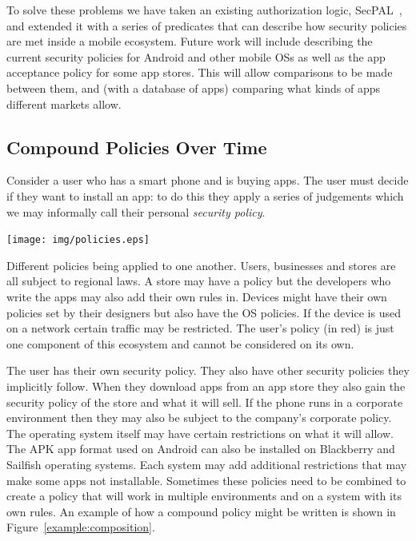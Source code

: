 \documentclass[a4paper]{article}
\begin{document}
To solve these problems we have taken an existing authorization logic,
SecPAL~\cite{Becker:2006vh}, and extended it with a series of predicates that
can describe how security policies are met inside a mobile ecosystem.  Future
work will include describing the current security policies for Android and other
mobile OSs as well as the app acceptance policy for some app stores.  This will
allow comparisons to be made between them, and (with a database of apps)
comparing what kinds of apps different markets allow.

\subsection{Compound Policies Over Time}\label{sec:polovertime}

Consider a user who has a smart phone and is buying apps.  The user must decide
if they want to install an app: to do this they apply a series of judgements
which we may informally call their personal \emph{security policy}.  

\begin{marginfigure}
  \label{fig:policies}
  \texttt{[image: img/policies.eps]}
  \caption{Different policies being applied to one another.  Users, businesses
  and stores are all subject to regional laws.  A store may have a policy but
the developers who write the apps may also add their own rules in.  Devices
might have their own policies set by their designers but also have the OS
policies.  If the device is used on a network certain traffic may be restricted.
The user's policy (in red) is just one component of this ecosystem and cannot be
considered on its own.}
\end{marginfigure}

The user has their own security policy. They also have other security policies
they implicitly follow.  When they download apps from an app store they also
gain the security policy of the store and what it will sell.  If the phone runs
in a corporate environment then they may also be subject to the company's
corporate policy.  The operating system itself may have certain restrictions on
what it will allow.  The APK app format used on Android can also be installed on
Blackberry and Sailfish operating systems.  Each system may add additional
restrictions that may make some apps not installable.  Sometimes these policies
need to be combined to create a policy that will work in multiple environments
and on a system with its own rules.  An example of how a compound policy might
be written is shown in Figure~\ref{example:composition}.
\end{document}
